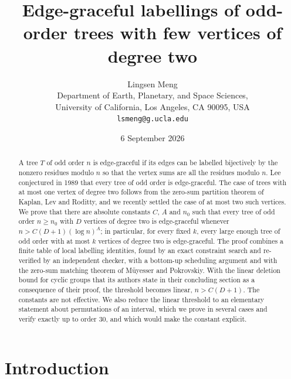 \documentclass[11pt,a4paper]{article}
\title{Edge-graceful labellings of odd-order trees with few vertices of degree two}
\author{Lingsen Meng\\[2pt]
  \small Department of Earth, Planetary, and Space Sciences,\\[-2pt]
  \small University of California, Los Angeles, CA 90095, USA\\[-2pt]
  \small \texttt{lsmeng@g.ucla.edu}}
\date{6 September 2026}
\theoremstyle{plain}
\theoremstyle{definition}
\theoremstyle{remark}
\begin{document}
\maketitle

\begin{abstract}
A tree $T$ of odd order $n$ is edge-graceful if its edges can be labelled
bijectively by the nonzero residues modulo $n$ so that the vertex sums are all
the residues modulo $n$.  Lee conjectured in 1989 that every tree of odd order
is edge-graceful.  The case of trees with at most one vertex of degree two
follows from the zero-sum partition theorem of Kaplan, Lev and Roditty, and
we recently settled the case of at most two such vertices.  We prove that
there are absolute constants $C$, $A$ and $n_0$ such that every tree of odd
order $n\ge n_0$ with $D$ vertices of degree two is edge-graceful whenever
$n>C(D+1)(\log n)^{A}$; in particular, for every fixed $k$, every large enough
tree of odd order with at most $k$ vertices of degree two is edge-graceful.
The proof combines a finite table of local labelling identities, found by an
exact constraint search and re-verified by an independent checker, with a
bottom-up scheduling argument and with the zero-sum matching theorem of
M\"uyesser and Pokrovskiy.  With the linear deletion bound for cyclic groups
that its authors state in their concluding section as a consequence of their
proof, the threshold becomes linear, $n>C(D+1)$.  The constants are not
effective.  We also reduce the linear
threshold to an elementary statement about permutations of an interval, which
we prove in several cases and verify exactly up to order $30$, and which would
make the constant explicit.
\end{abstract}

\section{Introduction}\label{sec:intro}
\end{document}
